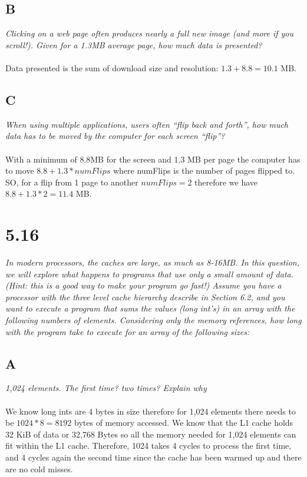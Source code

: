 \documentclass[10pt]{article}
\begin{document}
\subsection{B}
\textit{Clicking on a web page often produces nearly a full new image (and more if you
scroll!). Given for a 1.3MB average page, how much data is presented?}
\paragraph{} Data presented is the sum of download size and resolution: $1.3 + 8.8 = 10.1$ MB. 
\subsection{C}
\textit{When using multiple applications, users often “flip back and forth”, how much data
has to be moved by the computer for each screen “flip”?}
\paragraph{} With a minimum of 8.8MB for the screen and 1.3 MB per page the computer has to move 
$8.8 + 1.3*numFlips$ where numFlips is the number of pages flipped to. SO, for a flip from 1 page to another 
$numFlips = 2$ therefore we have $8.8 + 1.3*2 = 11.4$ MB. 

\section{5.16}
\textit{In modern processors, the caches are large, as much as 8-16MB. In this question,
we will explore what happens to programs that use only a small amount of data. (Hint: this
is a good way to make your program go fast!) Assume you have a processor with the three level cache 
hierarchy describe in Section 6.2, and you want to execute a program that sums the values (long int’s)
in an array with the following numbers of elements. Considering only the memory references, how long
with the program take to execute for an array of the following sizes:}
\subsection{A}
\textit{1,024 elements. The first time? two times? Explain why}
\paragraph{} We know long ints are 4 bytes in size therefore for 1,024 elements there needs to be $1024 * 8 = 
8192$ bytes of memory accessed. We know that the L1 cache holds 32 KiB of data or 32,768 Bytes so all the memory 
needed for 1,024 elements can fit within the L1 cache. Therefore, 1024 takes 4 cycles to process the first time, and 4 cycles again the second time
since the cache has been warmed up and there are no cold misses. 
\end{document}

